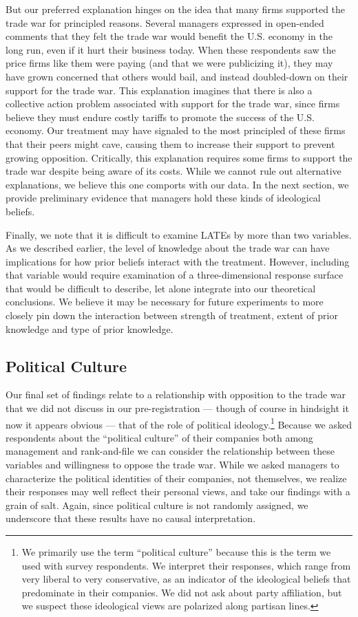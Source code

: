 \documentclass{article}
\begin{document}
But our preferred explanation hinges on the idea that many firms supported the trade war for principled reasons. Several managers expressed in open-ended comments that they felt the trade war would benefit the U.S. economy in the long run, even if it hurt their business today. When these respondents saw the price firms like them were paying (and that we were publicizing it), they may have grown concerned that others would bail, and instead doubled-down on their support for the trade war. This explanation imagines that there is also a collective action problem associated with support for the trade war, since firms believe they must  endure costly tariffs to promote the success of the U.S. economy. Our treatment may have signaled to the most principled of these firms that their peers might cave, causing them to increase their support to prevent growing opposition. Critically, this explanation requires some firms to support the trade war despite being aware of its costs. While we cannot rule out alternative explanations, we believe this one comports with our data. In the next section, we provide preliminary evidence that managers hold these kinds of ideological beliefs.

Finally, we note that it is difficult to examine LATEs by more than two variables. As we described earlier, the level of knowledge about the trade war can have implications for how prior beliefs interact with the treatment. However, including that variable would require examination of a three-dimensional response surface that would be difficult to describe, let alone integrate into our theoretical conclusions. We believe it may be necessary for future experiments to more closely pin down the interaction between strength of treatment, extent of prior knowledge and type of prior knowledge. 
 
\subsection{Political Culture}

Our final set of findings relate to a relationship with opposition to the trade war that we did not discuss in our pre-registration --- though of course in hindsight it now it appears obvious --- that of the role of political ideology.\footnote{We primarily use the term ``political culture'' because this is the term we used with survey respondents. We interpret their responses, which range from very liberal to very conservative, as an indicator of the ideological beliefs that predominate in their companies. We did not ask about party affiliation, but we suspect these ideological views are polarized along partisan lines.} Because we asked respondents about the ``political culture'' of their companies both among management and rank-and-file we can consider the relationship between these variables and willingness to oppose the trade war. While we asked managers to characterize the political identities of their companies, not themselves, we realize their responses may well reflect their personal views, and take our findings with a grain of salt. Again, since political culture is not randomly assigned, we underscore that these results have no causal interpretation.
\end{document}
